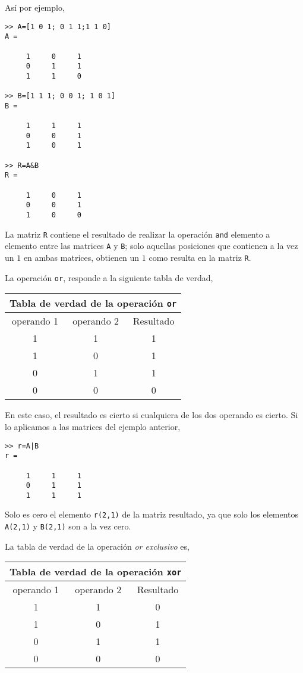 Así por ejemplo,

\begin{verbatim}
>> A=[1 0 1; 0 1 1;1 1 0]
A =

     1     0     1
     0     1     1
     1     1     0

>> B=[1 1 1; 0 0 1; 1 0 1]
B =

     1     1     1
     0     0     1
     1     0     1

>> R=A&B
R =

     1     0     1
     0     0     1
     1     0     0
\end{verbatim}

La matriz \texttt{R} contiene el resultado de realizar la operación \texttt{and} elemento a elemento entre las matrices \texttt{A} y \texttt{B}; solo aquellas posiciones que contienen a la vez un $1$ en ambas matrices, obtienen un $1$ como resulta en la matriz \texttt{R}.

La operación \texttt{or}, responde a la siguiente tabla de verdad,

\begin{table}[h]
\begin{tabular}{c|c|c}
\multicolumn{3}{c}{Tabla de verdad de la operación \texttt{or}}\\
\hline
\hline
operando 1&operando 2 &Resultado\\ 
\hline
1&1&1\\
1&0&1\\
0&1&1\\
0&0&0\\ 
\hline
\hline
\end{tabular}
\end{table} 

En  este caso, el resultado es cierto si cualquiera de los dos operando es cierto. Si lo aplicamos a las matrices del ejemplo anterior,

\begin{verbatim}
>> r=A|B
r =

     1     1     1
     0     1     1
     1     1     1
\end{verbatim}

Solo es cero el elemento \texttt{r(2,1)} de la matriz resultado, ya que solo los elementos \texttt{A(2,1)} y \texttt{B(2,1)} son a la vez cero.

La tabla de verdad de la operación \emph{or exclusivo} es,
\begin{table}[h]
\begin{tabular}{c|c|c}
\multicolumn{3}{c}{Tabla de verdad de la operación \texttt{xor}}\\
\hline
\hline
operando 1&operando 2 &Resultado\\ 
\hline
1&1&0\\
1&0&1\\
0&1&1\\
0&0&0\\ 
\hline
\hline
\end{tabular}
\end{table} 
  
